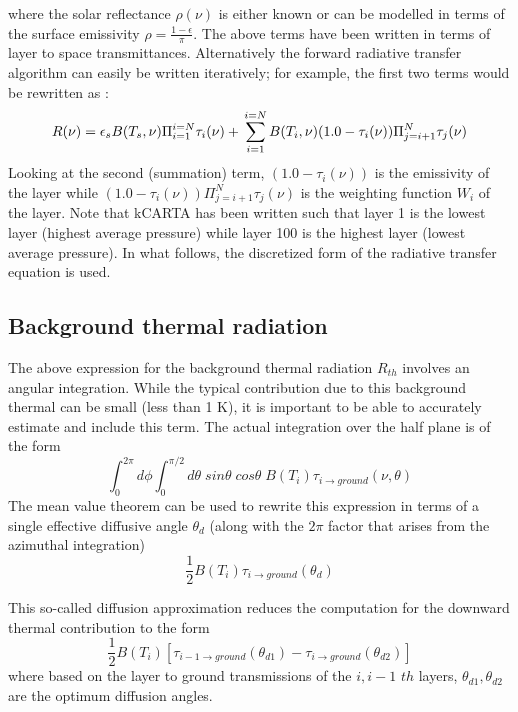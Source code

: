 \documentclass[11pt]{article}
\begin{document}
where the solar reflectance $\rho(\nu)$ is either known or can be modelled 
in terms of the surface emissivity $\rho = \frac{1 - \epsilon}{\pi}$.
The above terms have been written in terms of layer to space transmittances. 
Alternatively the forward radiative transfer algorithm can easily be written 
iteratively; for example, the first two terms would be rewritten as : 
\begin{equation}
R(\nu) = \epsilon_{s}B(T_{s},\nu) \Pi_{i=1}^{i=N} \tau_{i}(\nu) + \\
         \sum_{i=1}^{i=N} B(T_{i},\nu) (1.0 - \tau_{i}(\nu))\\
         \Pi_{j=i+1}^{N} \tau_{j}(\nu)
\end{equation}
Looking at the second (summation) term, $(1.0 - \tau_{i}(\nu))$ is the 
emissivity of the layer while 
$(1.0 - \tau_{i}(\nu)) \Pi_{j=i+1}^{N} \tau_{j}(\nu)$ is the weighting 
function $W_{i}$ of the layer. Note that \textsf{kCARTA} has been written 
such that layer 1 is the lowest layer (highest average pressure) while layer 
100 is the highest layer (lowest average pressure). In what follows, the 
discretized form of the radiative transfer equation is used.

\subsection{Background thermal radiation}
The above expression for the background thermal radiation $R_{th}$ involves 
an angular integration. While the typical contribution due to this background
thermal can be small (less than 1 K), it is important to be able to 
accurately estimate and include this term. The actual integration over the 
half plane is of the form  
\begin{equation}
    \int_{0}^{2\pi}d\phi \int_{0}^{\pi/2} 
    d\theta \; sin\theta \; cos\theta \; B(T_{i}) 
    \tau_{i \rightarrow ground}(\nu,\theta)
\end{equation}
The mean value theorem can be used to rewrite this expression in terms of a 
single effective diffusive angle $\theta_{d}$ (along with the $2\pi$ factor 
that arises from the azimuthal integration) 
\begin{equation}
   \frac{1}{2} B(T_{i}) \tau_{i \rightarrow ground}(\theta_{d})
\end{equation}

This so-called diffusion approximation \cite{lio:80} reduces the computation 
for the downward thermal contribution to the form
\begin{equation}
    \frac{1}{2}B(T_{i}) \left[ \tau_{i-1 \rightarrow ground}
(\theta_{d1})- \tau_{i \rightarrow ground}(\theta_{d2}) \right] 
\end{equation}
where based on the layer to ground transmissions of the $i,i-1$ $th$
layers,  $\theta_{d1},\theta_{d2}$ are the optimum diffusion angles. 
\end{document}
